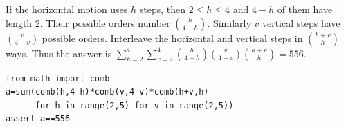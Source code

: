 If the horizontal motion uses $h$ steps, then $2\le h\le4$ and $4-h$ of them have length 2. Their possible orders number $\binom h{4-h}$. Similarly $v$ vertical steps have $\binom v{4-v}$ possible orders. Interleave the horizontal and vertical steps in $\binom{h+v}{h}$ ways. Thus the answer is $\sum_{h=2}^4\sum_{v=2}^4\binom h{4-h}\binom v{4-v}\binom{h+v}{h}=\boxed{556}$.
\begin{verbatim}
from math import comb
a=sum(comb(h,4-h)*comb(v,4-v)*comb(h+v,h)
      for h in range(2,5) for v in range(2,5))
assert a==556
\end{verbatim}
